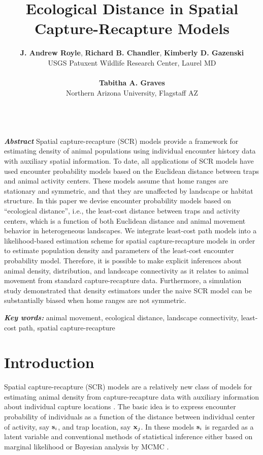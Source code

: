 \documentclass[12pt]{article}
\title{Ecological Distance in Spatial Capture-Recapture Models}
\author{
{\bf J. Andrew Royle}, {\bf Richard B. Chandler},
{\bf Kimberly D. Gazenski} \\
USGS Patuxent Wildlife Research Center, Laurel MD \\ \\
{\bf Tabitha A. Graves} \\
Northern Arizona University, Flagstaff AZ \\ \\
}
\begin{document}
\maketitle

\date


\linenumbers


\begin{spacing}{1.8}

\begin{flushleft}
{\em \bf Abstract}
Spatial capture-recapture (SCR) models provide a framework for
estimating density of animal populations using individual encounter
history data with auxiliary spatial information.  To date, all
applications of SCR models have used encounter probability models
based on the Euclidean distance between traps and animal activity
centers. These models assume that home ranges are stationary and
symmetric, and that they are unaffected by landscape or habitat
structure. In this paper we devise encounter probability models based
on ``ecological distance'', i.e., the least-cost distance between
traps and activity centers, which is a function of both Euclidean
distance and animal movement behavior in heterogeneous landscapes. We
integrate least-cost path models into a likelihood-based estimation
scheme for spatial capture-recapture models in order to estimate
population density and parameters of the least-cost encounter
probability model.  Therefore, it is possible to make explicit
inferences about animal density, distribution, and landscape
connectivity as it relates to animal movement from standard
capture-recapture data.  Furthermore, a simulation study demonstrated
that density estimators under the naive SCR model can be substantially
biased when home ranges are not symmetric.

{\em \bf Key words:} animal movement, ecological distance, landscape connectivity,
least-cost path, spatial capture-recapture

\end{flushleft}



\section{Introduction}


Spatial capture-recapture (SCR) models are a relatively new class of models
for estimating animal density from capture-recapture data with
auxiliary information about individual capture locations
\citep{efford:2004,borchers_efford:2008, royle_young:2008, efford_etal:2009ecol,
  royle_etal:2009ecol}.
The basic idea is to express encounter probability of
individuals as a function of the distance between individual center of
activity, say ${\bf s}_{i}$, and trap location, say ${\bf x}_{j}$.  
In these models ${\bf s}_{i}$ is regarded as a latent variable and
conventional methods of statistical inference either based on marginal
likelihood \citep{borchers_efford:2008} or Bayesian analysis by MCMC
\citep{royle_young:2008}.


\end{spacing}
\end{document}
